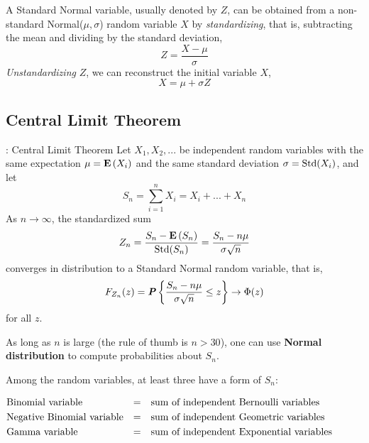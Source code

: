 \begin{multicols}{2}
A Standard Normal variable, usually denoted by $Z$, can be obtained from a non-standard Normal($\mu, \sigma$) random variable $X$ by \textit{standardizing}, that is, subtracting the mean and dividing by the standard deviation,
\begin{equation*}
    Z = \frac{X - \mu}{\sigma}
\end{equation*}
\textit{Unstandardizing} $Z$, we can reconstruct the initial variable $X$,
\begin{equation*}
    X = \mu + \sigma Z
\end{equation*}

\end{multicols}


\subsection{Central Limit Theorem}

\begin{theorem}{: Central Limit Theorem}
  Let $X_1, X_2, ...$ be independent random variables with the same expectation $\mu = \mathbf{E}\left(X_i\right)$ and the same standard deviation $\sigma = \textnormal{Std}(X_i)$, and let
  \begin{equation*}
      S_n = \sum_{i=1}^{n} X_i = X_i + ... + X_n
  \end{equation*}
  As $n \to \infty$, the standardized sum
  \begin{equation*}
      Z_n = \frac{S_n - \mathbf{E}\left(S_n\right)}{\textnormal{Std}(S_n)} = \frac{S_n - n\mu}{\sigma\sqrt{n}}
  \end{equation*}
  converges in distribution to a Standard Normal random variable, that is,
  \begin{equation*}
      F_{Z_n}(z) = \textbf{\textit{P}}\left\{\frac{S_n-n\mu}{\sigma\sqrt{n}} \leq z\right\} \to \Phi(z)
  \end{equation*}
  for all $z$.
\end{theorem}
\noindent As long as $n$ is large (the rule of thumb is $n > 30$), one can use \textbf{Normal distribution} to compute probabilities about $S_n$.

\noindent Among the random variables, at least three have a form of $S_n$:

$\begin{aligned}
    &\textnormal{Binomial variable} &= &&&\textnormal{sum of independent Bernoulli variables}\\
    &\textnormal{Negative Binomial variable} &= &&&\textnormal{sum of independent Geometric variables}\\
    &\textnormal{Gamma variable} &= &&&\textnormal{sum of independent Exponential variables}
\end{aligned}$

